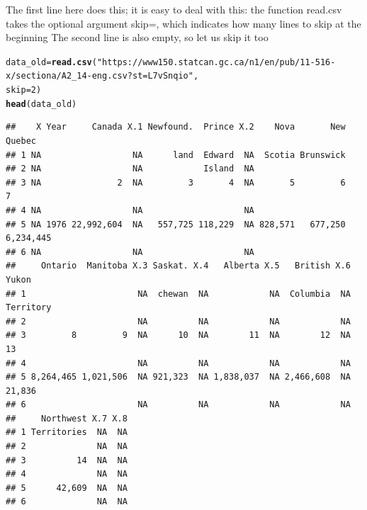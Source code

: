 \documentclass[aspectratio=169]{beamer}\usepackage[]{graphicx}\usepackage[]{xcolor}
\makeatletter
\newcommand{\hlnum}[1]{\textcolor[rgb]{0.686,0.059,0.569}{#1}}%
\newcommand{\hlsng}[1]{\textcolor[rgb]{0.192,0.494,0.8}{#1}}%
\newcommand{\hldef}[1]{\textcolor[rgb]{0.345,0.345,0.345}{#1}}%
\newcommand{\hlkwb}[1]{\textcolor[rgb]{0.69,0.353,0.396}{#1}}%
\newcommand{\hlkwc}[1]{\textcolor[rgb]{0.333,0.667,0.333}{#1}}%
\newcommand{\hlkwd}[1]{\textcolor[rgb]{0.737,0.353,0.396}{\textbf{#1}}}%
\newenvironment{kframe}{%
 \def\at@end@of@kframe{}%
 \ifinner\ifhmode%
  \def\at@end@of@kframe{\end{minipage}}%
  \begin{minipage}{\columnwidth}%
 \fi\fi%
 \def\FrameCommand##1{\hskip\@totalleftmargin \hskip-\fboxsep
 \colorbox{shadecolor}{##1}\hskip-\fboxsep
     \hskip-\linewidth \hskip-\@totalleftmargin \hskip\columnwidth}%
 \MakeFramed {\advance\hsize-\width
   \@totalleftmargin\z@ \linewidth\hsize
   \@setminipage}}%
 {\par\unskip\endMakeFramed%
 \at@end@of@kframe}
\newenvironment{knitrout}{}{} %
\makeatother
\begin{document}
\begin{frame}[fragile]
The first line here does this; it is easy to deal with this: the function read.csv takes the optional argument skip=, which indicates how many lines to skip at the beginning
The second line is also empty, so let us skip it too

\begin{knitrout}
\color{fgcolor}\begin{kframe}
\begin{alltt}
\hldef{data_old} \hlkwb{=} \hlkwd{read.csv}\hldef{(}\hlsng{"https://www150.statcan.gc.ca/n1/en/pub/11-516-x/sectiona/A2_14-eng.csv?st=L7vSnqio"}\hldef{,}
                    \hlkwc{skip} \hldef{=} \hlnum{2}\hldef{)}
\hlkwd{head}\hldef{(data_old)}
\end{alltt}
\begin{verbatim}
##    X Year     Canada X.1 Newfound.  Prince X.2    Nova       New    Quebec
## 1 NA                  NA      land  Edward  NA  Scotia Brunswick          
## 2 NA                  NA            Island  NA                            
## 3 NA               2  NA         3       4  NA       5         6         7
## 4 NA                  NA                    NA                            
## 5 NA 1976 22,992,604  NA   557,725 118,229  NA 828,571   677,250 6,234,445
## 6 NA                  NA                    NA                            
##     Ontario  Manitoba X.3 Saskat. X.4   Alberta X.5   British X.6     Yukon
## 1                      NA  chewan  NA            NA  Columbia  NA Territory
## 2                      NA          NA            NA            NA          
## 3         8         9  NA      10  NA        11  NA        12  NA        13
## 4                      NA          NA            NA            NA          
## 5 8,264,465 1,021,506  NA 921,323  NA 1,838,037  NA 2,466,608  NA    21,836
## 6                      NA          NA            NA            NA          
##     Northwest X.7 X.8
## 1 Territories  NA  NA
## 2              NA  NA
## 3          14  NA  NA
## 4              NA  NA
## 5      42,609  NA  NA
## 6              NA  NA
\end{verbatim}
\end{kframe}
\end{knitrout}
\end{frame}
\end{document}
